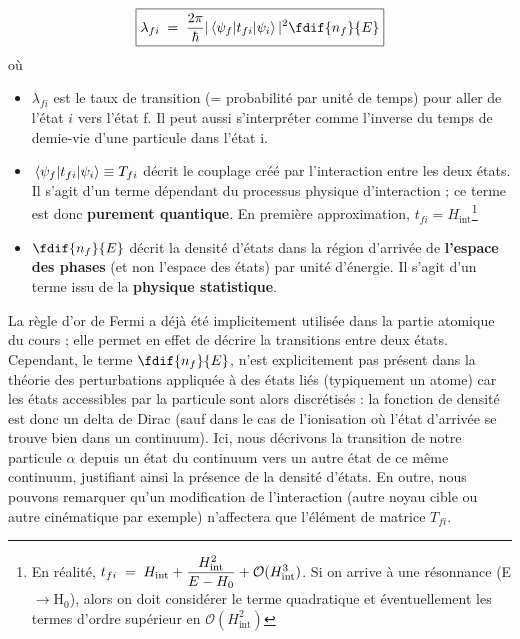 \[
\boxed{
    \lambda_{fi} \eq
    \dfrac{2\pi}{\hbar }|\mel{\psi_f}{t_{fi}}{\psi_i}|^2 \fdif{n_f}{E}
    \label{fermi}
}
\]
où

\begin{itemize}
    \item $\lambda_{fi}$ est le taux de transition (= probabilité par unité de temps) pour aller de l'état $i$ vers l'état f. Il peut aussi s'interpréter comme l'inverse du temps de demie-vie d'une particule dans l'état i.
    \item $\mel{\psi_f}{t_{fi}}{\psi_i} \equiv T_{fi}$ décrit le couplage créé par l'interaction entre les deux états. Il s'agit d'un terme dépendant du processus physique d'interaction ; ce terme est donc \textbf{purement quantique}. En première approximation, $t_{fi} = H_\text{int}$\footnote{En réalité, $t_{fi} \; = \; H_\text{int} + \dfrac{H_\text{int}^2}{E-H_0} + \mathcal{O}(H_\text{int}^3) $. Si on arrive à une résonnance (E$\rightarrow$H$_0$), alors on doit considérer le terme quadratique et éventuellement les termes d'ordre supérieur en $\mathcal{O}(H_\text{int}^2)$ }
    \item $\fdif{n_f}{E}$ décrit la densité d'états dans la région d'arrivée de \textbf{l'espace des phases} (et non l'espace des états) par unité d'énergie. Il s'agit d'un terme issu de la \textbf{physique statistique}.
\end{itemize}


La règle d'or de Fermi a déjà été implicitement utilisée dans la partie atomique du cours ; elle permet en effet de décrire la transitions entre deux états. Cependant, le terme $\fdif{n_f}{E}$, n'est explicitement pas présent dans la théorie des perturbations appliquée à des états liés (typiquement un atome) car les états accessibles par la particule sont alors discrétisés : la fonction de densité est donc un delta de Dirac (sauf dans le cas de l'ionisation où l'état d'arrivée se trouve bien dans un continuum). Ici, nous décrivons la transition de notre particule $\alpha$ depuis un état du continuum vers un autre état de ce même continuum, justifiant ainsi la présence de la densité d'états. 
En outre, nous pouvons remarquer qu'un modification de l'interaction (autre noyau cible ou autre cinématique par exemple) n'affectera que l'élément de matrice $T_{fi}$.

